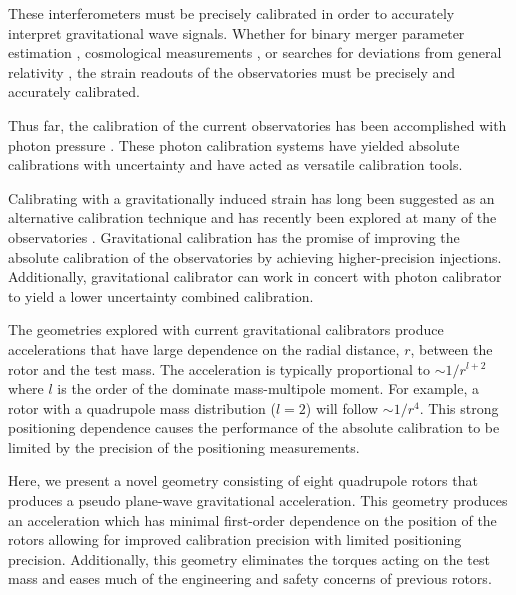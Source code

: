 \documentclass[superscriptaddress, twocolumn, prd]{revtex4-1}
\begin{document}
These interferometers must be precisely calibrated in order to accurately interpret gravitational wave signals. Whether for binary merger parameter estimation \cite{abbott2020population}, cosmological measurements \cite{abbott2021gravitational, ligo2017gravitational}, or searches for deviations from general relativity \cite{abbott2020tests}, the strain readouts of the observatories must be precisely and accurately calibrated.

Thus far, the calibration of the current observatories has been accomplished with photon pressure \cite{PCal}. These photon calibration systems have yielded absolute calibrations with  uncertainty and have acted as versatile calibration tools. 

Calibrating with a gravitationally induced strain has long been suggested as an alternative calibration technique \cite{hirakawa1980dynamical, kuroda1985experimental, mio1987experimental, astone1991evaluation, astone1998experimental, Matone_2007} and has recently been explored at many of the observatories \cite{Estevez_2018, estevez2021newtonian, PhysRevD.98.022005, ncal}. Gravitational calibration has the promise of improving the absolute calibration of the observatories by achieving higher-precision injections. Additionally, gravitational calibrator can work in concert with photon calibrator to yield a lower uncertainty combined calibration.

The geometries explored with current gravitational calibrators \cite{Estevez_2018, estevez2021newtonian, PhysRevD.98.022005, ncal} produce accelerations that have large dependence on the radial distance, $r$, between the rotor and the test mass. The acceleration is typically proportional to $\sim1/r^{l+2}$ where $l$ is the order of the dominate mass-multipole moment. For example, a rotor with a quadrupole mass distribution ($l=2$) will follow $\sim1/r^4$. This strong positioning dependence causes the performance of the absolute calibration to be limited by the precision of the positioning measurements. 

Here, we present a novel geometry consisting of eight quadrupole rotors that produces a pseudo plane-wave gravitational acceleration. This geometry produces an acceleration which has minimal first-order dependence on the position of the rotors allowing for improved calibration precision with limited positioning precision. Additionally, this geometry eliminates the torques acting on the test mass and eases much of the engineering and safety concerns of previous rotors.
\end{document}
